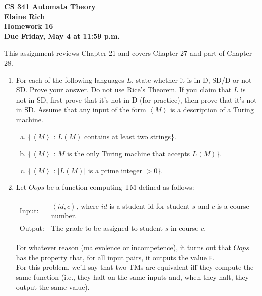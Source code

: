 \documentclass[10pt]{article}
\newcommand{\card}[1]{\left| #1 \right|}
\newcommand{\brackets}[1]{\left< #1 \right>}
\begin{document}
\begin{center}
\textbf{
CS 341 Automata Theory \\
Elaine Rich \\
Homework 16 \\
Due Friday, May 4 at 11:59 p.m.}\\
\end{center}

\noindent
This assignment reviews Chapter 21 and covers Chapter 27 and part of Chapter 28.\\

\begin{enumerate}[1)]


\item
For each of the following languages $L$, state whether it is in D, SD/D or not SD.  Prove your answer.  Do not use
Rice’s Theorem.  If you claim that $L$ is not in SD, first prove that it’s not in D (for practice), then prove that it’s not
in SD.  Assume that any input of the form $\brackets{M}$ is a description of a Turing machine.
\begin{enumerate}[a)]
\item
\{$\brackets{M}$ : $L(M)$ contains at least two strings\}.
\item
\{$\brackets{M}$ : $M$ is the only Turing machine that accepts $L(M)$\}.
\item
\{$\brackets{M}$ : $\card{L(M)}$ is a prime integer $> 0$\}.
\end{enumerate}


\item
Let $Oops$ be a function-computing TM defined as follows:
\begin{center}
\begin{tabular}{p{2cm} l}
Input:&$\brackets{id, c}$, where $id$ is a student id for student $s$ and $c$ is a course number.\\
Output:&The grade to be assigned to student $s$ in course $c$.
\end{tabular}
\end{center}

For whatever reason (malevolence or incompetence), it turns out that $Oops$ has the property that, for all input pairs, it outputs the value \texttt{F}.\\

For this problem, we’ll say that two TMs are equivalent iff they compute the same function (i.e., they halt on the same inputs and, when they halt, they output the same value).\\


\end{enumerate}
\end{document}
